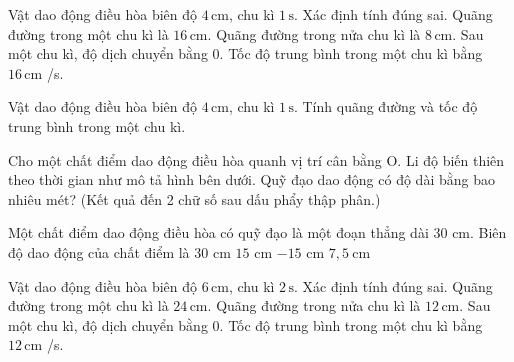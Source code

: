 \begin{ex}
Vật dao động điều hòa biên độ $4\,\text{cm}$, chu kì $1\,\text{s}$. Xác định tính đúng sai.
\choiceTF
{\True Quãng đường trong một chu kì là $16\,\text{cm}$.}
{\True Quãng đường trong nửa chu kì là $8\,\text{cm}$.}
{\True Sau một chu kì, độ dịch chuyển bằng 0.}
{\True Tốc độ trung bình trong một chu kì bằng $16\,\text{cm}$ /s.}
\end{ex}

\begin{ex}
Vật dao động điều hòa biên độ $4\,\text{cm}$, chu kì $1\,\text{s}$. Tính quãng đường và tốc độ trung bình trong một chu kì.
\choiceTF

\end{ex}

\begin{ex}
Cho một chất điểm dao động điều hòa quanh vị trí cân bằng O. Li độ biến thiên theo thời gian như mô tả hình bên dưới. Quỹ đạo dao động có độ dài bằng bao nhiêu mét? (Kết quả đến 2 chữ số sau dấu phẩy thập phân.)
\end{ex}

\begin{ex}
Một chất điểm dao động điều hòa có quỹ đạo là một đoạn thẳng dài $30$ cm. Biên độ dao động của chất điểm là
\choice
{$30$ cm}
{\True $15$ cm}
{$-15$ cm}
{$7,5\mathrm{~cm}$}
\end{ex}

\begin{ex}
Vật dao động điều hòa biên độ $6\,\text{cm}$, chu kì $2\,\text{s}$. Xác định tính đúng sai.
\choiceTF
{\True Quãng đường trong một chu kì là $24\,\text{cm}$.}
{\True Quãng đường trong nửa chu kì là $12\,\text{cm}$.}
{\True Sau một chu kì, độ dịch chuyển bằng 0.}
{\True Tốc độ trung bình trong một chu kì bằng $12\,\text{cm}$ /s.}
\end{ex}

